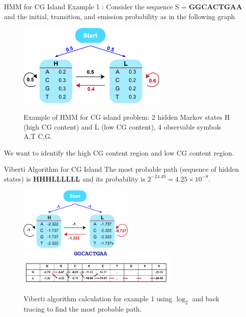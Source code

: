 \documentclass{beamer}
\begin{document}
\begin{frame}{HMM for CG Island}
	Example 1 \cite{borodovsky2006problems}: Consider the sequence S = \textbf{GGCACTGAA} and the initial, transition, and emission probability as in the following graph
	\begin{figure}
		\centering
		\includegraphics[width = 0.65\textwidth]{example1.jpg}
		\label{fig:example1}
		\caption{Example of HMM for CG island problem: 2 hidden Markov states H (high CG content) and L (low CG content), 4 observable symbols A,T C,G.}
	\end{figure}
	We want to identify the high CG content region and low CG content region.
\end{frame} 

\begin{frame}{Viberti Algorithm for CG Island}
	 The most probable path (sequence of hidden states) is \textbf{HHHLLLLLL} and its probability is $2^{-24.49} = 4.25 \times 10^{-8}$.
	\begin{figure}
		\centering
		\includegraphics[width = 0.5\textwidth]{example1log.jpg}
		\includegraphics[width = 0.7\textwidth]{example1cal.png}
		\label{fig:example2cal}
		\caption{Viberti algorithm calculation for example 1 using $\log_2$ and back tracing to find the most probable path.}
	\end{figure}
\end{frame}
\end{document}

